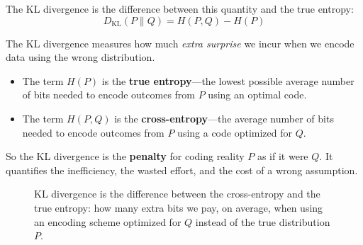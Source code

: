\vspace{1em}


The KL divergence is the difference between this quantity and the true entropy:
\[
D_{\mathrm{KL}}(P \parallel Q) = H(P, Q) - H(P)
\]

The KL divergence measures how much \emph{extra surprise} we incur when we encode data using the wrong distribution.

\begin{itemize}
	\item The term \( H(P) \) is the \textbf{true entropy}—the lowest possible average number of bits needed to encode outcomes from \( P \) using an optimal code.
	\item The term \( H(P, Q) \) is the \textbf{cross-entropy}—the average number of bits needed to encode outcomes from \( P \) using a code optimized for \( Q \).
\end{itemize}

So the KL divergence is the \textbf{penalty} for coding reality \( P \) as if it were \( Q \). It quantifies the inefficiency, the wasted effort, and the cost of a wrong assumption.

\vspace{1em}

\begin{figure}[H]
\centering
{}
\caption{
KL divergence is the difference between the cross-entropy and the true entropy: how many extra bits we pay, on average, when using an encoding scheme optimized for \( Q \) instead of the true distribution \( P \).
}
\end{figure}

